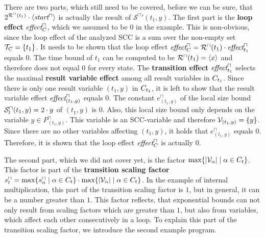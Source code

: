 There are two parts, which still need to be covered, before we can be sure, that $2^{{\mathcal{R}^\sqcap}(t_1)} \cdot \langle\emph{start}^\sqcap\rangle$ is actually the result of ${\mathcal{S}^\sqcap}'(t_1,y)$.
The first part is the \textbf{loop effect} $\emph{effect}^\sqcap_C$, which we assumed to be $0$ in the example.
This is non-obvious, since the loop effect of the analyzed SCC is a sum over the non-empty set $\mathcal{T}_C = \lbrace t_1 \rbrace$.
It needs to be shown that the loop effect $\emph{effect}^\sqcap_C = {\mathcal{R}^\sqcap}(t_1) \cdot \emph{effect}^\sqcap_{t_1}$ equals $0$.
The time bound of $t_1$ can be computed to be ${\mathcal{R}^\sqcap}(t_1) = \langle x\rangle$ and therefore does not equal $0$ for every state.
The \textbf{transition effect} $\emph{effect}^\sqcap_{t_1}$ selects the maximal \textbf{result variable effect} among all result variables in $C_{t_1}$.
Since there is only one result variable $(t_1,y)$ in $C_{t_1}$, it is left to show that the result variable effect $\emph{effect}^\sqcap_{(t_1,y)}$ equals $0$.
The constant $e^\sqcap_{(t_1,y)}$ of the local size bound ${\mathcal{S}^\sqcap_l}(t_1,y) = 2 \cdot y$ of $(t_1,y)$ is $0$.
Also, this local size bound only depends on the variable $y \in P^\sqcap_{(t_1,y)}$.
This variable is an SCC-variable and therefore $\mathcal{V}_{(t_1,y)} = \lbrace y \rbrace$.
Since there are no other variables affecting $(t_1,y)$, it holds that $e^\sqcap_{(t_1,y)}$ equals $0$.
Therefore, it is shown that the loop effect $\emph{effect}^\sqcap_C$ is actually $0$.

The second part, which we did not cover yet, is the factor $\max \lbrace \left|\mathcal{V}_\alpha\right| \mid \alpha \in C_t \rbrace$.
This factor is part of the \textbf{transition scaling factor} $s^\sqcap_t = \max \lbrace s^\sqcap_\alpha \mid \alpha \in C_t \rbrace \cdot \max \lbrace \left|\mathcal{V}_\alpha\right| \mid \alpha \in C_t \rbrace$.
In the example of internal multiplication, this part of the transition scaling factor is $1$, but in general, it can be a number greater than $1$.
This factor reflects, that exponential bounds can not only result from scaling factors which are greater than $1$, but also from variables, which affect each other consecutively in a loop.
To explain this part of the transition scaling factor, we introduce the second example program.

